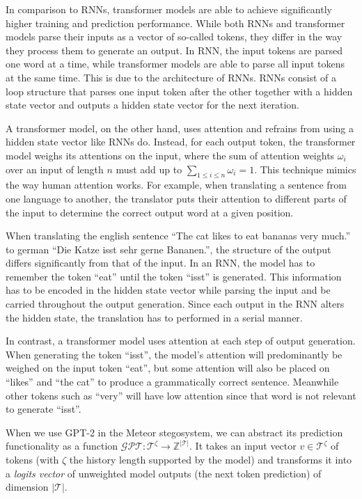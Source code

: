 In comparison to RNNs, transformer models are able to achieve significantly higher training and prediction performance.
While both RNNs and transformer models parse their inputs as a vector of so-called tokens, they differ in the way they process them to generate an output.
In RNN, the input tokens are parsed one word at a time, while transformer models are able to parse all input tokens at the same time.
This is due to the architecture of RNNs.
RNNs consist of a loop structure that parses one input token after the other together with a hidden state vector and outputs a hidden state vector for the next iteration.

A transformer model, on the other hand, uses attention and refrains from using a hidden state vector like RNNs do.
Instead, for each output token, the transformer model weighs its attentions on the input, where the sum of attention weights $\omega_i$ over an input of length $n$ must add up to $\sum_{1\leq i \leq n} \omega_i = 1$.
This technique mimics the way human attention works.
For example, when translating a sentence from one language to another, the translator puts their attention to different parts of the input to determine the correct output word at a given position.

\begin{example}
  When translating the english sentence ``The cat likes to eat bananas very much.'' to german ``Die Katze isst sehr gerne Bananen.'', the structure of the output differs significantly from that of the input.
  In an RNN, the model has to remember the token ``eat'' until the token ``isst'' is generated.
  This information has to be encoded in the hidden state vector while parsing the input and be carried throughout the output generation.
  Since each output in the RNN alters the hidden state, the translation has to performed in a serial manner.
    
  In contrast, a transformer model uses attention at each step of output generation.
  When generating the token ``isst'', the model's attention will predominantly be weighed on the input token ``eat'', but some attention will also be placed on ``likes'' and ``the cat'' to produce a grammatically correct sentence.
  Meanwhile other tokens such as ``very'' will have low attention since that word is not relevant to generate ``isst''.
\end{example}



When we use GPT-2 in the Meteor stegosystem, we can abstract its prediction functionality as a function $\mathcal{GPT} \colon \mathcal{T}^\zeta \rightarrow \mathbb{Z}^{|\mathcal{T}|}$.
It takes an input vector $v \in \mathcal{T}^\zeta$ of tokens (with $\zeta$ the history length supported by the model) and transforms it into a \emph{logits vector} of unweighted model outputs (the next token prediction) of dimension $|\mathcal{T}|$.


